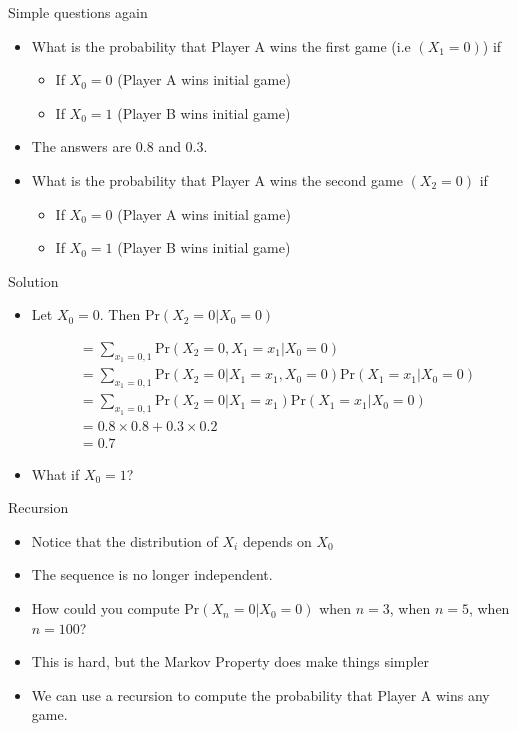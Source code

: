 \documentclass[10pt]{beamer}
\begin{document}
\begin{frame}{Simple questions again}
\begin{itemize}
\item What is the probability that Player A wins the first game (i.e $(X_1=0)$) if

\begin{itemize}
\item If $X_0=0$ (Player A wins initial game)

\item If $X_0=1$ (Player B wins initial game)
\end{itemize}

\item The answers are 0.8 and 0.3.

\item What is the probability that Player A wins the second game $(X_2=0)$ if

\begin{itemize}
\item If $X_0=0$ (Player A wins initial game)

\item If $X_0=1$ (Player B wins initial game)
\end{itemize}
\end{itemize}
\end{frame}
\begin{frame}{Solution}
\begin{itemize}
\item Let $X_0=0$.  Then $\mbox{Pr}(X_2=0|X_0=0)$

\begin{align*}
&=\sum_{x_1=0,1}\mbox{Pr}(X_2=0,X_1=x_1|X_0=0)\\
&=\sum_{x_1=0,1}\mbox{Pr}(X_2=0|X_1=x_1,X_0=0)
\mbox{Pr}(X_1=x_1|X_0=0)\\
&=\sum_{x_1=0,1}\mbox{Pr}(X_2=0|X_1=x_1)\mbox{Pr}(X_1=x_1|X_0=0)\\
&=0.8\times 0.8+0.3\times 0.2\\
&=0.7
\end{align*}

\item What if $X_0=1$?
\end{itemize}
\end{frame}
\begin{frame}{Recursion}
\begin{itemize}
\item Notice that the distribution of $X_i$ depends on $X_0$

\item The sequence is no longer independent.

\item How could you compute $\mbox{Pr}(X_n=0|X_0=0)$ when $n=3$, when $n=5$, when $n=100$?

\item This is hard, but the Markov Property does make things simpler

\item We can use a recursion to compute the probability that Player A wins any game.
\end{itemize}
\end{frame}
\end{document}
